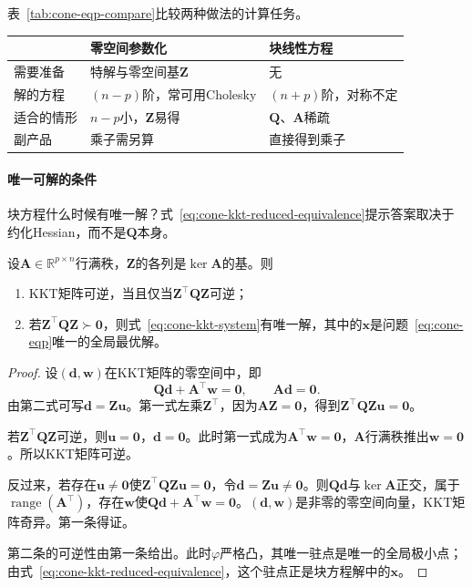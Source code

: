 表~\ref{tab:cone-eqp-compare}比较两种做法的计算任务。

\begin{BookInlineTable}
  \centering
  \begin{tabular}{lll}
    \toprule
    & 零空间参数化 & 块线性方程\\
    \midrule
    需要准备 & 特解与零空间基$\bm{Z}$ & 无\\
    解的方程 & $(n-p)$阶，常可用Cholesky & $(n+p)$阶，对称不定\\
    适合的情形 & $n-p$小，$\bm{Z}$易得 & $\bm{Q}$、$\bm{A}$稀疏\\
    副产品 & 乘子需另算 & 直接得到乘子\\
    \bottomrule
  \end{tabular}
  \caption{等式约束二次问题的两种解法。$\bm{Z}$通常来自$\bm{A}^\top$的QR分解，$\bm{Q}$、$\bm{A}$稀疏时$\bm{Z}$和$\bm{Z}^\top\bm{Q}\bm{Z}$可能变稠密。}
  \label{tab:cone-eqp-compare}
\end{BookInlineTable}

\paragraph{唯一可解的条件}
块方程什么时候有唯一解？式~\eqref{eq:cone-kkt-reduced-equivalence}提示答案取决于约化Hessian，而不是$\bm{Q}$本身。

\begin{theorem}[KKT矩阵的可逆性]
\label{thm:cone-kkt-invertible}
设$\bm{A}\in\mathbb{R}^{p\times n}$行满秩，$\bm{Z}$的各列是$\ker\bm{A}$的基。则
\begin{enumerate}
 \item KKT矩阵可逆，当且仅当$\bm{Z}^\top\bm{Q}\bm{Z}$可逆；
 \item 若$\bm{Z}^\top\bm{Q}\bm{Z}\succ\bm{0}$，则式~\eqref{eq:cone-kkt-system}有唯一解，其中的$\bm{x}$是问题~\eqref{eq:cone-eqp}唯一的全局最优解。
\end{enumerate}
\end{theorem}

\begin{proof}
设$(\bm{d},\bm{w})$在KKT矩阵的零空间中，即
\[
 \bm{Q}\bm{d}+\bm{A}^\top\bm{w}=\bm{0},\qquad\bm{A}\bm{d}=\bm{0}.
\]
由第二式可写$\bm{d}=\bm{Z}\bm{u}$。第一式左乘$\bm{Z}^\top$，因为$\bm{A}\bm{Z}=\bm{0}$，得到$\bm{Z}^\top\bm{Q}\bm{Z}\bm{u}=\bm{0}$。

若$\bm{Z}^\top\bm{Q}\bm{Z}$可逆，则$\bm{u}=\bm{0}$，$\bm{d}=\bm{0}$。此时第一式成为$\bm{A}^\top\bm{w}=\bm{0}$，$\bm{A}$行满秩推出$\bm{w}=\bm{0}$。所以KKT矩阵可逆。

反过来，若存在$\bm{u}\neq\bm{0}$使$\bm{Z}^\top\bm{Q}\bm{Z}\bm{u}=\bm{0}$，令$\bm{d}=\bm{Z}\bm{u}\neq\bm{0}$。则$\bm{Q}\bm{d}$与$\ker\bm{A}$正交，属于$\operatorname{range}(\bm{A}^\top)$，存在$\bm{w}$使$\bm{Q}\bm{d}+\bm{A}^\top\bm{w}=\bm{0}$。$(\bm{d},\bm{w})$是非零的零空间向量，KKT矩阵奇异。第一条得证。

第二条的可逆性由第一条给出。此时$\varphi$严格凸，其唯一驻点是唯一的全局极小点；由式~\eqref{eq:cone-kkt-reduced-equivalence}，这个驻点正是块方程解中的$\bm{x}$。
\end{proof}

